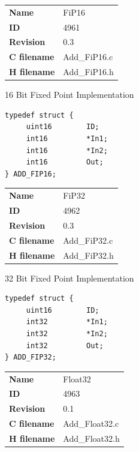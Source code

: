 \ifdefined \AddTestReports
{}
\fi
{}
\nopagebreak[0]
\begin{tabular}{l l}
\textbf{Name} & FiP16 \tabularnewline
\textbf{ID} & 4961 \tabularnewline
\textbf{Revision} & 0.3 \tabularnewline
\textbf{C filename} & Add\_FiP16.c \tabularnewline
\textbf{H filename} & Add\_FiP16.h \tabularnewline
\end{tabular}
\vspace{1ex}

16 Bit Fixed Point Implementation

\begin{lstlisting}
typedef struct {
     uint16        ID;
     int16         *In1;
     int16         *In2;
     int16         Out;
} ADD_FIP16;
\end{lstlisting}

\ifdefined \AddTestReports
{}
\fi
{}
\nopagebreak[0]
\begin{tabular}{l l}
\textbf{Name} & FiP32 \tabularnewline
\textbf{ID} & 4962 \tabularnewline
\textbf{Revision} & 0.3 \tabularnewline
\textbf{C filename} & Add\_FiP32.c \tabularnewline
\textbf{H filename} & Add\_FiP32.h \tabularnewline
\end{tabular}
\vspace{1ex}

32 Bit Fixed Point Implementation

\begin{lstlisting}
typedef struct {
     uint16        ID;
     int32         *In1;
     int32         *In2;
     int32         Out;
} ADD_FIP32;
\end{lstlisting}

\ifdefined \AddTestReports
{}
\fi
{}
\nopagebreak[0]
\begin{tabular}{l l}
\textbf{Name} & Float32 \tabularnewline
\textbf{ID} & 4963 \tabularnewline
\textbf{Revision} & 0.1 \tabularnewline
\textbf{C filename} & Add\_Float32.c \tabularnewline
\textbf{H filename} & Add\_Float32.h \tabularnewline
\end{tabular}
\vspace{1ex}

